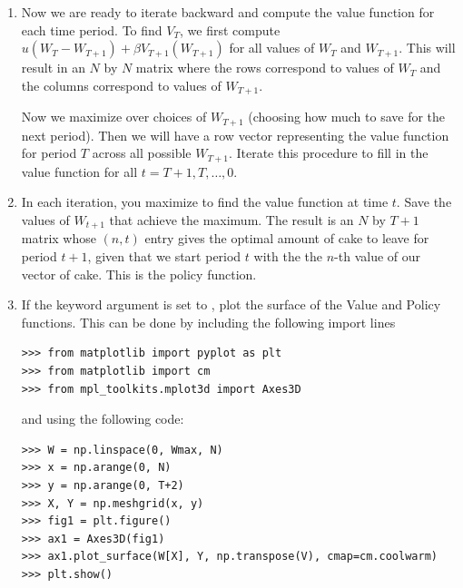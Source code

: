 \begin{problem}
\begin{enumerate}
\item Now we are ready to iterate backward and compute the value function for each time period.  To find $V_T$, we first compute
$u(W_T - W_{T+1}) + \beta V_{T+1}(W_{T+1})$ for all values of $W_{T}$ and $W_{T+1}$.  This will result in an $N$ by $N$ matrix
where the rows correspond to values of $W_{T}$ and the columns correspond to values of $W_{T+1}$.

Now we maximize over choices of $W_{T+1}$ (choosing how much to save for the next period).  Then we will have a row vector
representing the value function for period $T$ across all possible $W_{T+1}$.  Iterate this procedure to fill in the value
function for all $t=T+1,T,\ldots, 0$.

\item In each iteration, you maximize to find the value function at time $t$.  Save the values of $W_{t+1}$ that achieve the
maximum.  The result is an $N$ by $T+1$ matrix whose $(n,t)$ entry gives the optimal amount of cake to leave for period
$t+1$, given that we start period $t$ with the the $n$-th value of our vector of cake.  This is the policy function.

\item If the keyword argument  is set to , plot the surface of the Value and Policy functions.
This can be done by including the following import lines
\begin{lstlisting}
>>> from matplotlib import pyplot as plt
>>> from matplotlib import cm
>>> from mpl_toolkits.mplot3d import Axes3D
\end{lstlisting}
and using the following code:
\begin{lstlisting}
>>> W = np.linspace(0, Wmax, N)
>>> x = np.arange(0, N)
>>> y = np.arange(0, T+2)
>>> X, Y = np.meshgrid(x, y)
>>> fig1 = plt.figure()
>>> ax1 = Axes3D(fig1)
>>> ax1.plot_surface(W[X], Y, np.transpose(V), cmap=cm.coolwarm)
>>> plt.show()


\end{lstlisting}
\end{enumerate}
\end{problem}

